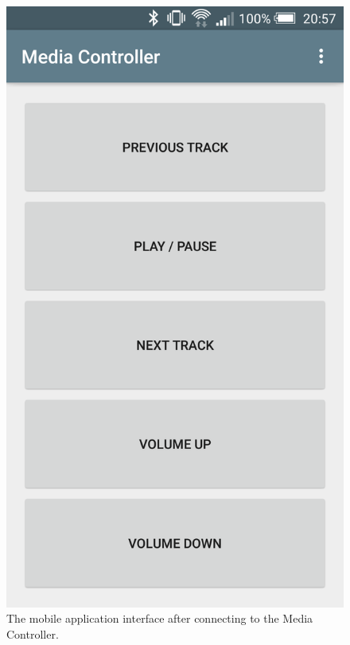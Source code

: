 \documentclass{article}
\begin{document}
\begin{figure}[h]
\begin{minipage}[h]{0.29\textwidth}
					\includegraphics[width=\textwidth]{app}
					\caption{The mobile application interface after connecting to the Media Controller.}
					\label{fig:app}
				\end{minipage}
				\hfill
				\begin{minipage}[h]{0.29\textwidth}
					\centering

\end{minipage}
\end{figure}
\end{document}
